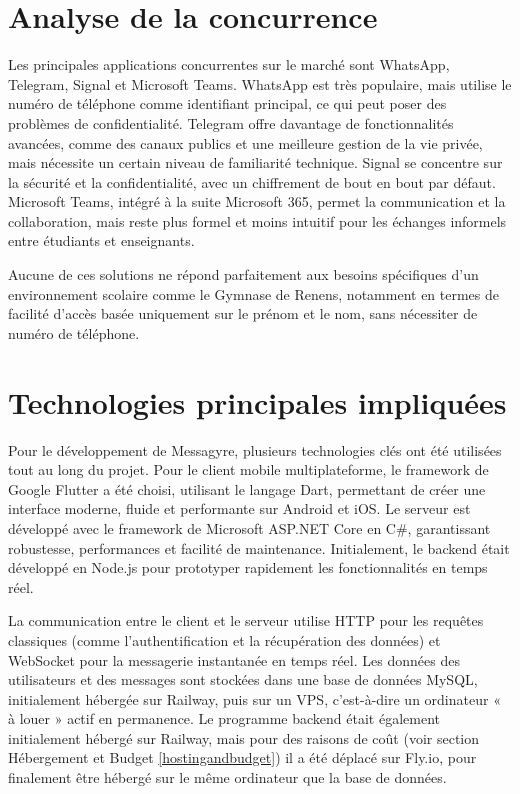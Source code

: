 \documentclass[12pt]{report}
\begin{document}
	\section{Analyse de la concurrence}
	
	Les principales applications concurrentes sur le marché sont WhatsApp\supercite{whatsapp}, Telegram\supercite{telegram}, Signal\supercite{signal} et Microsoft Teams\supercite{teams}. WhatsApp\supercite{whatsapp} est très populaire, mais utilise le numéro de téléphone comme identifiant principal, ce qui peut poser des problèmes de confidentialité. Telegram\supercite{telegram} offre davantage de fonctionnalités avancées, comme des canaux publics et une meilleure gestion de la vie privée, mais nécessite un certain niveau de familiarité technique. Signal\supercite{signal} se concentre sur la sécurité et la confidentialité, avec un chiffrement de bout en bout par défaut. Microsoft Teams\supercite{teams}, intégré à la suite Microsoft 365, permet la communication et la collaboration, mais reste plus formel et moins intuitif pour les échanges informels entre étudiants et enseignants.  
	
	Aucune de ces solutions ne répond parfaitement aux besoins spécifiques d’un environnement scolaire comme le Gymnase de Renens, notamment en termes de facilité d’accès basée uniquement sur le prénom et le nom, sans nécessiter de numéro de téléphone.
	
	\section{Technologies principales impliquées}
	
	Pour le développement de Messagyre, plusieurs technologies clés ont été utilisées tout au long du projet. Pour le client mobile multiplateforme, le framework de Google\supercite{google} Flutter\supercite{flutter} a été choisi, utilisant le langage Dart\supercite{dart}, permettant de créer une interface moderne, fluide et performante sur Android et iOS. Le serveur est développé avec le framework de Microsoft\supercite{microsoft} ASP.NET Core\supercite{aspnetcore} en C\#\supercite{csharp}, garantissant robustesse, performances et facilité de maintenance. Initialement, le backend était développé en Node.js\supercite{nodejs} pour prototyper rapidement les fonctionnalités en temps réel.
	
	La communication entre le client et le serveur utilise HTTP\supercite{http} pour les requêtes classiques (comme l'authentification et la récupération des données) et WebSocket\supercite{websocket} pour la messagerie instantanée en temps réel. Les données des utilisateurs et des messages sont stockées dans une base de données MySQL\supercite{mysql}, initialement hébergée sur Railway\supercite{railway}, puis sur un VPS, c’est-à-dire un ordinateur « à louer » actif en permanence. Le programme backend était également initialement hébergé sur Railway, mais pour des raisons de coût (voir section Hébergement et Budget \ref{hostingandbudget}) il a été déplacé sur Fly.io\supercite{flyio}, pour finalement être hébergé sur le même ordinateur que la base de données.
	
\end{document}
